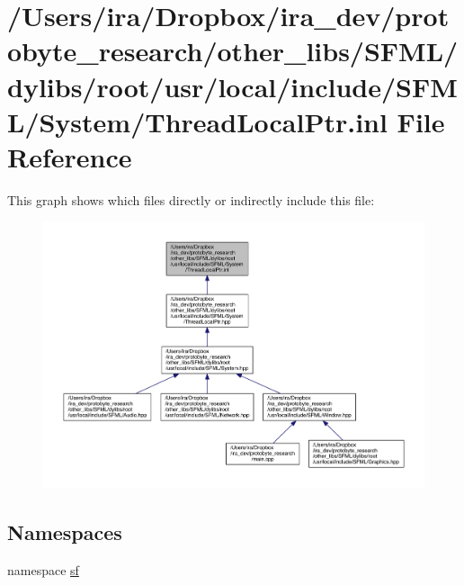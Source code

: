 \hypertarget{_thread_local_ptr_8inl}{\section{/\-Users/ira/\-Dropbox/ira\-\_\-dev/protobyte\-\_\-research/other\-\_\-libs/\-S\-F\-M\-L/dylibs/root/usr/local/include/\-S\-F\-M\-L/\-System/\-Thread\-Local\-Ptr.inl File Reference}
\label{_thread_local_ptr_8inl}
}
This graph shows which files directly or indirectly include this file\-:
\nopagebreak
\begin{figure}[H]
\begin{center}
\leavevmode
\includegraphics[width=350pt]{_thread_local_ptr_8inl__dep__incl}
\end{center}
\end{figure}
\subsection*{Namespaces}
\begin{DoxyCompactItemize}
\item 
namespace \hyperlink{namespacesf}{sf}
\end{DoxyCompactItemize}
